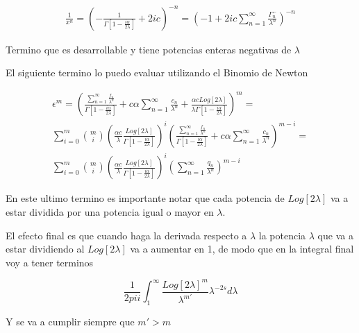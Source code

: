 \begin{equation}
\begin{array}{c}
\frac{1}{x ^n} = 
\left(
	- \frac{1}{\Gamma [1 - \frac{i \alpha}{2 \lambda}]}
	+ 
	2 i c
	\right) ^{-n} =
\left(
	- 1 + 2 i c\sum _{n=1} ^{\infty} \frac{\Gamma ^{-} _n }{\lambda ^n}
	\right) ^{-n} 
\end{array}
\end{equation}

Termino que es desarrollable y tiene potencias enteras negativas de $\lambda$

El siguiente termino lo puedo evaluar utilizando el Binomio de Newton

\begin{equation}
\begin{array}{c}
\epsilon ^{m} = 
\left(
		\frac{\sum _{n=1} ^{\infty} \frac{f _n}{\lambda ^n}}
			 {\Gamma[1- \frac{i \alpha}{2 \lambda}]}		
		+ c \alpha \sum _{n=1} ^{\infty} \frac{c _n}{\lambda ^n} +
		\frac{\alpha c Log[2 \lambda]}{\lambda \Gamma [1 - \frac{i \alpha}{2 \lambda} ]}	
		\right) ^m = \\
\sum _{i=0} ^{m}
{m\choose i}
\left(
	\frac{\alpha c}{\lambda} \frac{Log [2 \lambda]}{\Gamma [1- \frac{i \alpha}{2 \lambda}]}
	\right) ^{i}
\left(
	\frac{\sum _{n=1} ^{\infty} \frac{f _n}{\lambda ^n}}
		{\Gamma[1- \frac{i \alpha}{2 \lambda}]}		
		+ c \alpha \sum _{n=1} ^{\infty} \frac{c _n}{\lambda ^n} 
	\right) ^{m-i } = \\
\sum _{i=0} ^{m}
{m\choose i}
\left(
	\frac{\alpha c}{\lambda} \frac{Log [2 \lambda]}{\Gamma [1- \frac{i \alpha}{2 \lambda}]}
	\right) ^{i} 
\left(
	\sum _{n=1} ^{\infty} \frac{q_n}{\lambda ^n}
\right) ^{m-i}
\end{array}
\end{equation}

En este ultimo termino es importante notar que cada potencia de $Log[2 \lambda]$ va a estar dividida por una potencia igual o mayor en $\lambda$.

El efecto final es que cuando haga la derivada respecto a $\lambda$ la potencia $\lambda$ que va a estar dividiendo al $Log[2 \lambda]$ va a aumentar en 1, de modo que en la integral final voy a tener terminos

\begin{equation}
\frac{1}{2 pi i} 
\int _{1} ^{\infty} \frac{Log[2 \lambda] ^{m}}{\lambda ^{m'}} \lambda ^{-2s} d \lambda
\end{equation}

Y se va a cumplir siempre que $m'> m$



